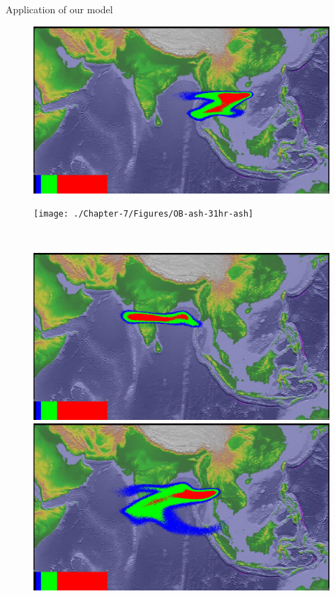 \documentclass{beamer}
\begin{document}
\begin{frame}{Application of our model}
\begin{figure}[!htb]
\begin{minipage}{.295\textwidth}
    \end{minipage}%
    \begin{minipage}{.295\textwidth}
        \centering
        \includegraphics[width=0.99 \textwidth]{./Chapter-7/Figures/SPH-Plume-31hr-ash}
    \end{minipage}%
    \begin{minipage}{.295\textwidth}
        \centering
        \texttt{[image: ./Chapter-7/Figures/OB-ash-31hr-ash]}
    \end{minipage}%
    \\
        \begin{minipage}{.295\textwidth}
        \centering
        \includegraphics[width=0.99 \textwidth]{./Chapter-7/Figures/bent-55hr-ash}
    \end{minipage}%
    \begin{minipage}{.295\textwidth}
        \centering
        \includegraphics[width=0.99 \textwidth]{./Chapter-7/Figures/SPH-Plume-55hr-ash}

\end{minipage}
\end{figure}
\end{frame}
\end{document}
